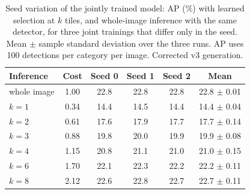 \begin{table}[t]
\caption{Seed variation of the jointly trained model: AP (\%) with learned selection at $k$ tiles, and whole-image inference with the same detector, for three joint trainings that differ only in the seed. Mean $\pm$ sample standard deviation over the three runs. AP uses 100 detections per category per image. Corrected v3 generation.}
\label{tab:seeds}
\centering
\begin{tabular}{lccccc}
\toprule
Inference & Cost & Seed 0 & Seed 1 & Seed 2 & Mean \\
\midrule
whole image & 1.00 & 22.8 & 22.8 & 22.8 & 22.8 $\pm$ 0.01 \\
$k{=}1$ & 0.34 & 14.4 & 14.5 & 14.4 & 14.4 $\pm$ 0.04 \\
$k{=}2$ & 0.61 & 17.6 & 17.9 & 17.7 & 17.7 $\pm$ 0.14 \\
$k{=}3$ & 0.88 & 19.8 & 20.0 & 19.9 & 19.9 $\pm$ 0.08 \\
$k{=}4$ & 1.15 & 20.8 & 21.1 & 21.0 & 21.0 $\pm$ 0.15 \\
$k{=}6$ & 1.70 & 22.1 & 22.3 & 22.2 & 22.2 $\pm$ 0.11 \\
$k{=}8$ & 2.12 & 22.6 & 22.8 & 22.7 & 22.7 $\pm$ 0.11 \\
\bottomrule
\end{tabular}
\end{table}
